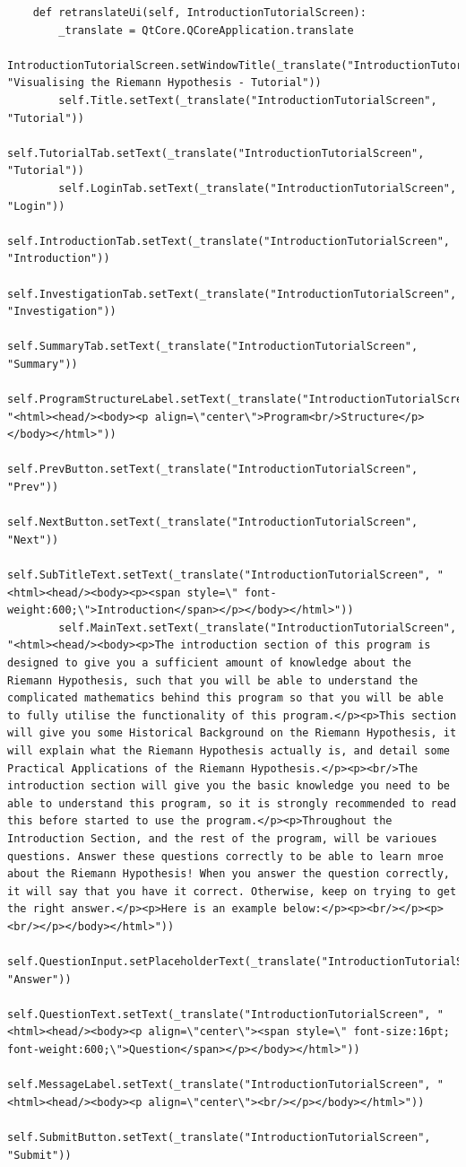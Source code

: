 \documentclass[12pt]{article}
\begin{document}
\begin{lstlisting}
    def retranslateUi(self, IntroductionTutorialScreen):
        _translate = QtCore.QCoreApplication.translate
        IntroductionTutorialScreen.setWindowTitle(_translate("IntroductionTutorialScreen", "Visualising the Riemann Hypothesis - Tutorial"))
        self.Title.setText(_translate("IntroductionTutorialScreen", "Tutorial"))
        self.TutorialTab.setText(_translate("IntroductionTutorialScreen", "Tutorial"))
        self.LoginTab.setText(_translate("IntroductionTutorialScreen", "Login"))
        self.IntroductionTab.setText(_translate("IntroductionTutorialScreen", "Introduction"))
        self.InvestigationTab.setText(_translate("IntroductionTutorialScreen", "Investigation"))
        self.SummaryTab.setText(_translate("IntroductionTutorialScreen", "Summary"))
        self.ProgramStructureLabel.setText(_translate("IntroductionTutorialScreen", "<html><head/><body><p align=\"center\">Program<br/>Structure</p></body></html>"))
        self.PrevButton.setText(_translate("IntroductionTutorialScreen", "Prev"))
        self.NextButton.setText(_translate("IntroductionTutorialScreen", "Next"))
        self.SubTitleText.setText(_translate("IntroductionTutorialScreen", "<html><head/><body><p><span style=\" font-weight:600;\">Introduction</span></p></body></html>"))
        self.MainText.setText(_translate("IntroductionTutorialScreen", "<html><head/><body><p>The introduction section of this program is designed to give you a sufficient amount of knowledge about the Riemann Hypothesis, such that you will be able to understand the complicated mathematics behind this program so that you will be able to fully utilise the functionality of this program.</p><p>This section will give you some Historical Background on the Riemann Hypothesis, it will explain what the Riemann Hypothesis actually is, and detail some Practical Applications of the Riemann Hypothesis.</p><p><br/>The introduction section will give you the basic knowledge you need to be able to understand this program, so it is strongly recommended to read this before started to use the program.</p><p>Throughout the Introduction Section, and the rest of the program, will be varioues questions. Answer these questions correctly to be able to learn mroe about the Riemann Hypothesis! When you answer the question correctly, it will say that you have it correct. Otherwise, keep on trying to get the right answer.</p><p>Here is an example below:</p><p><br/></p><p><br/></p></body></html>"))
        self.QuestionInput.setPlaceholderText(_translate("IntroductionTutorialScreen", "Answer"))
        self.QuestionText.setText(_translate("IntroductionTutorialScreen", "<html><head/><body><p align=\"center\"><span style=\" font-size:16pt; font-weight:600;\">Question</span></p></body></html>"))
        self.MessageLabel.setText(_translate("IntroductionTutorialScreen", "<html><head/><body><p align=\"center\"><br/></p></body></html>"))
        self.SubmitButton.setText(_translate("IntroductionTutorialScreen", "Submit"))
\end{lstlisting}
\end{document}
